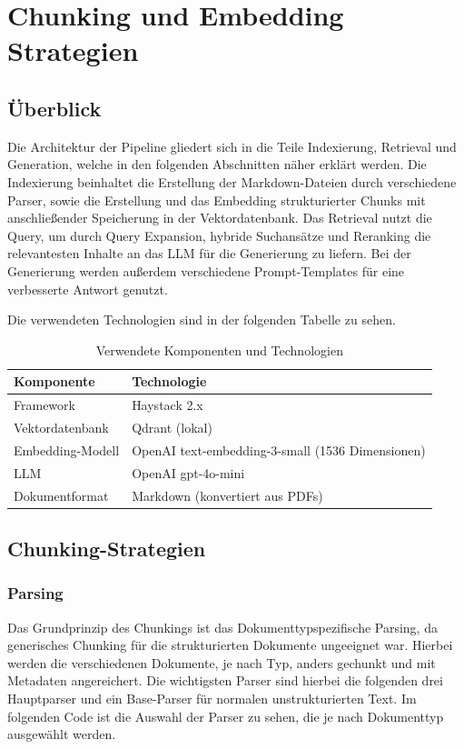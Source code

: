\chapter{Chunking und Embedding Strategien}
\label{chap:chunking}

\section{Überblick}

Die Architektur der Pipeline gliedert sich in die Teile Indexierung, Retrieval und Generation, welche in den folgenden Abschnitten näher erklärt werden. Die Indexierung beinhaltet die Erstellung der Markdown-Dateien durch verschiedene Parser, sowie die Erstellung und das Embedding strukturierter Chunks mit anschließender Speicherung in der Vektordatenbank. Das Retrieval nutzt die Query, um durch Query Expansion, hybride Suchansätze und Reranking die relevantesten Inhalte an das LLM für die Generierung zu liefern. Bei der Generierung werden außerdem verschiedene Prompt-Templates für eine verbesserte Antwort genutzt.

Die verwendeten Technologien sind in der  folgenden Tabelle zu sehen.
\begin{table}[htbp]
\centering
\begin{tabular}{|l|p{8.5cm}|}
\hline
\textbf{Komponente} & \textbf{Technologie} \\
\hline
Framework & Haystack 2.x \\
Vektordatenbank & Qdrant (lokal) \\
Embedding-Modell & OpenAI text-embedding-3-small (1536 Dimensionen) \\
LLM & OpenAI gpt-4o-mini \\
Dokumentformat & Markdown (konvertiert aus PDFs) \\
\hline
\end{tabular}

\caption{Verwendete Komponenten und Technologien}
\label{tab:komponenten_technologien}

\end{table}
\section{Chunking-Strategien}

\subsection{Parsing}
Das Grundprinzip des Chunkings ist das Dokumenttypspezifische Parsing, da generisches Chunking für die strukturierten Dokumente ungeeignet war. Hierbei werden die verschiedenen Dokumente, je nach Typ, anders gechunkt und mit Metadaten angereichert. Die wichtigsten Parser sind hierbei die folgenden drei Hauptparser und ein Base-Parser für normalen unstrukturierten Text. Im folgenden Code ist die Auswahl der Parser zu sehen, die je nach Dokumenttyp ausgewählt werden.

